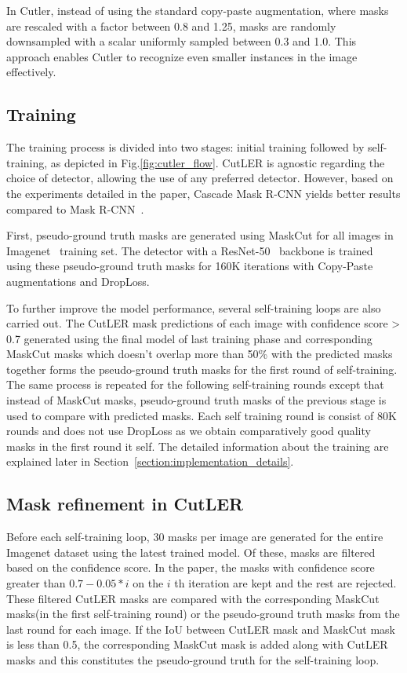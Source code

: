 In Cutler, instead of using the standard copy-paste augmentation, where masks are rescaled with a factor between 0.8 and 1.25, masks are randomly downsampled with a scalar uniformly sampled between 0.3 and 1.0. This approach enables Cutler to recognize even smaller instances in the image effectively.

\subsection{Training}
The training process is divided into two stages: initial training followed by self-training, as depicted in Fig.\ref{fig:cutler_flow}. CutLER is agnostic regarding the choice of detector, allowing the use of any preferred detector. However, based on the experiments detailed in the paper, Cascade Mask R-CNN\cite{cai2019cascadercnnhighquality} yields better results compared to Mask R-CNN~\cite{he2018maskrcnn}.

First, pseudo-ground truth masks are generated using MaskCut for all images in Imagenet~\cite{deng2009imagenet} training set. The detector with a ResNet-50~\cite{he2015deepresiduallearningimage} backbone is trained using these pseudo-ground truth masks for 160K iterations with Copy-Paste augmentations and DropLoss.

To further improve the model performance, several self-training loops are also carried out. The CutLER mask predictions of each image with confidence score > 0.7 generated using the final model of last training phase and corresponding MaskCut masks which doesn't overlap more than 50\% with the predicted masks together forms the pseudo-ground truth masks for the first round of self-training. The same process is repeated for the following self-training rounds except that instead of MaskCut masks, pseudo-ground truth masks of the previous stage is used to compare with predicted masks. Each self training round is consist of 80K rounds and does not use DropLoss as we obtain comparatively good quality masks in the first round it self. The detailed information about the training are explained later in Section~\ref{section:implementation_details}.

\subsection{Mask refinement in CutLER}
Before each self-training loop, 30 masks per image are generated for the entire Imagenet dataset using the latest trained model. Of these, masks are filtered based on the confidence score. In the paper, the masks with confidence score greater than \(0.7 - 0.05 * i\) on the \(i\) th iteration are kept and the rest are rejected. These filtered CutLER masks are compared with the corresponding MaskCut masks(in the first self-training round) or the pseudo-ground truth masks from the last round for each image. If the IoU between CutLER mask and MaskCut mask is less than 0.5, the corresponding MaskCut mask is added along with CutLER masks and this constitutes the pseudo-ground truth for the self-training loop.

